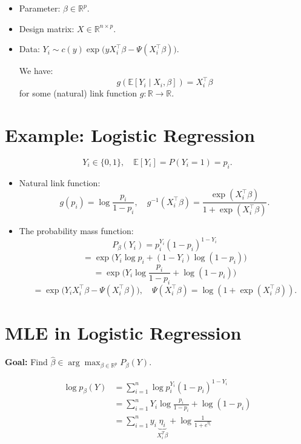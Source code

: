 \documentclass[open=any, 11pt,paper=A4]{scrreprt}
\begin{document}
\begin{itemize}
    \item Parameter: \( \beta \in \mathbb{R}^p \).
    \item Design matrix: \( X \in \mathbb{R}^{n \times p} \).
    \item Data: \( Y_i \sim c(y)\exp\big(yX_i^\top \beta - \Psi(X_i^\top \beta)\big) \).

    We have:
    \[
    g(\mathbb{E}[Y_i \mid X_i, \beta]) = X_i^\top \beta
    \]
    for some (natural) link function \( g: \mathbb{R} \to \mathbb{R} \).
\end{itemize}


\section*{Example: Logistic Regression}

\[
Y_i \in \{0, 1\}, \quad \mathbb{E}[Y_i] = P(Y_i = 1) = p_i.
\]

\begin{itemize}
    \item Natural link function:
    \[
    g(p_i) = \log\frac{p_i}{1 - p_i}, \quad g^{-1}(X_i^\top \beta) = \frac{\exp(X_i^\top \beta)}{1 + \exp(X_i^\top \beta)}.
    \]

    \item The probability mass function:
    \[
    P_\beta(Y_i) = p_i^{Y_i}(1 - p_i)^{1 - Y_i}
    \]
    \[
    = \exp\big(Y_i \log p_i + (1 - Y_i)\log(1 - p_i)\big)
    \]
    \[
    = \exp\big(Y_i \log \frac{p_i}{1 - p_i} + \log(1 - p_i)\big)
    \]
    \[
    = \exp\big(Y_i X_i^\top \beta - \Psi(X_i^\top \beta)\big), \quad \Psi(X_i^\top \beta) = \log(1 + \exp(X_i^\top \beta)).
    \]
\end{itemize}


\section*{MLE in Logistic Regression}

\textbf{Goal:} Find \( \hat{\beta} \in \arg\max_{\beta \in \mathbb{R}^p} P_\beta(Y) \).

\begin{align*}
    \log p_\beta(Y)&= \sum_{i=1}^{n} \log p_i^{Y_i}(1-p_i)^{1-Y_i}\\
    &=\sum_{i=1}^{n} Y_i \log \frac{p_i}{1- p_i} + \log (1-p_i)\\
    &= \sum_{i=1}^{n} y_i \underbrace{\eta_i}_{X_i^T\beta} +\log \frac{1}{1+e^{\eta_i}}
\end{align*}
\end{document}
